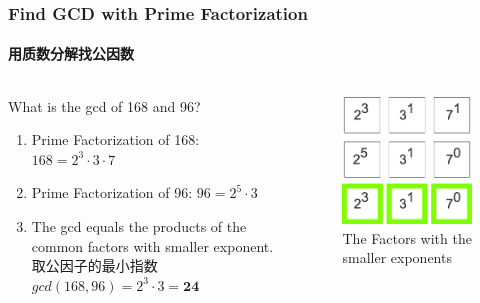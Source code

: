 \documentclass[
	11pt, %
	handout,
]{beamer}
\begin{document}
\begin{frame}	
	\frametitle{Find GCD with Prime Factorization}
	\framesubtitle{用质数分解找公因数}
		\begin{columns}[t] %
			\begin{column}{0.45\textwidth} %
				What is the gcd of 168 and 96?
			 \begin{enumerate}
			 	\item Prime Factorization of 168: $168=2^3 \cdot 3 \cdot 7$
			 	\item Prime Factorization of 96: $96=2^5 \cdot 3$
			 	\item The gcd equals the products of the common factors with smaller exponent.\\ 取公因子的最小指数 \\ $gcd(168, 96) = 2^3 \cdot 3 = \textbf{24}$
			 	\end{enumerate}

			\end{column}
			\begin{column}{0.5\textwidth} %
			\begin{figure}
			\includegraphics[width=0.8\linewidth]{168_96_GCD.png}
			\caption{The Factors with the smaller exponents}
		\end{figure}
			
			\end{column}
		\end{columns}
\end{frame}
\end{document}
